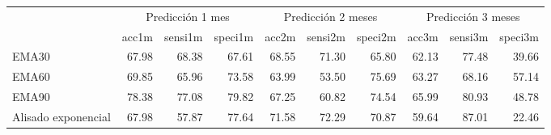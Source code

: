 \documentclass[]{article}
\newenvironment{Shaded}{\begin{snugshade}}{\end{snugshade}}
\newcommand{\KeywordTok}[1]{\textcolor[rgb]{0.13,0.29,0.53}{\textbf{#1}}}
\newcommand{\DataTypeTok}[1]{\textcolor[rgb]{0.13,0.29,0.53}{#1}}
\newcommand{\DecValTok}[1]{\textcolor[rgb]{0.00,0.00,0.81}{#1}}
\newcommand{\StringTok}[1]{\textcolor[rgb]{0.31,0.60,0.02}{#1}}
\newcommand{\OperatorTok}[1]{\textcolor[rgb]{0.81,0.36,0.00}{\textbf{#1}}}
\newcommand{\NormalTok}[1]{#1}
\begin{document}
\begin{Shaded}
\end{Shaded}

\begin{table}[H]
\centering\begingroup\fontsize{10}{12}\selectfont

\begin{tabular}{l|r|r|r|r|r|r|r|r|r}
\hline
\multicolumn{1}{c|}{ } & \multicolumn{3}{|c|}{Predicción 1 mes} & \multicolumn{3}{|c|}{Predicción 2 meses} & \multicolumn{3}{|c}{Predicción 3 meses} \\
\cline{2-4} \cline{5-7} \cline{8-10}
  & acc1m & sensi1m & speci1m & acc2m & sensi2m & speci2m & acc3m & sensi3m & speci3m\\
\hline
EMA30 & 67.98 & 68.38 & 67.61 & 68.55 & 71.30 & 65.80 & 62.13 & 77.48 & 39.66\\
\hline
EMA60 & 69.85 & 65.96 & 73.58 & 63.99 & 53.50 & 75.69 & 63.27 & 68.16 & 57.14\\
\hline
EMA90 & 78.38 & 77.08 & 79.82 & 67.25 & 60.82 & 74.54 & 65.99 & 80.93 & 48.78\\
\hline
Alisado exponencial & 67.98 & 57.87 & 77.64 & 71.58 & 72.29 & 70.87 & 59.64 & 87.01 & 22.46\\
\hline
\end{tabular}\endgroup{}
\end{table}
\end{document}

